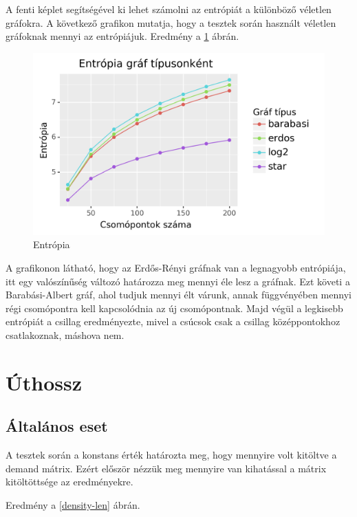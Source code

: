 \documentclass[12pt]{report}
\begin{document}
A fenti képlet segítségével ki lehet számolni az entrópiát a különböző véletlen gráfokra.
A következő grafikon mutatja, hogy a tesztek során használt véletlen gráfoknak mennyi az entrópiájuk.
Eredmény a \ref{entropy} ábrán.

\begin{figure}[H]
	\begin{center}
		\includegraphics[width=0.9\linewidth]{pictures/entropy.png}
		\caption{Entrópia}
		\label{entropy}
	\end{center}
\end{figure}

A grafikonon látható, hogy az Erdős-Rényi gráfnak van a legnagyobb entrópiája, itt egy valószínűség változó határozza meg mennyi éle lesz a gráfnak.
Ezt követi a Barabási-Albert gráf, ahol tudjuk mennyi élt várunk, annak függvényében mennyi régi csomópontra kell kapcsolódnia az új csomópontnak.
Majd végül a legkisebb entrópiát a csillag eredményezte, mivel a csúcsok csak a csillag középpontokhoz csatlakoznak, máshova nem.

\section{Úthossz}

\subsection{Általános eset}

A tesztek során a konstans érték határozta meg, hogy mennyire volt kitöltve a demand mátrix.
Ezért először nézzük meg mennyire van kihatással a mátrix kitöltöttsége az eredményekre.

Eredmény a \ref{density-len} ábrán.
\end{document}
